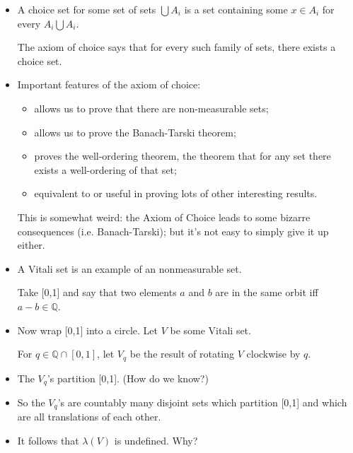 \documentclass[justified]{tufte-handout}
\begin{document}
\begin{itemize}

\item A choice set for some set of sets $\bigcup A_i$ is a set containing some $x \in A_i$ for every $A_i \bigcup A_i$.

The axiom of choice says that for every such family of sets, there exists a choice set.

\item Important features of the axiom of choice:

\begin{itemize}

\item allows us to prove that there are non-measurable sets;


\item allows us to prove the Banach-Tarski theorem;

\item proves the well-ordering theorem, the theorem that for any set there exists a well-ordering of that set;

\item equivalent to or useful in proving lots of other interesting results.


\end{itemize}

\noindent This is somewhat weird: the Axiom of Choice leads to some bizarre consequences (i.e. Banach-Tarski); but it's not easy to simply give it up either.


\item A Vitali set is an example of an nonmeasurable set. 

Take [0,1] and say that two elements $a$ and $b$ are in the same orbit iff $a-b \in \mathbb{Q}$.

\item Now wrap [0,1] into a circle. Let $V$ be some Vitali set. 

For $q\in\mathbb{Q}\cap[0,1]$, let $V_q$ be the result of rotating $V$ clockwise by $q$.

\item The $V_q$'s partition [0,1]. (How do we know?)

\item So the $V_q$'s are countably many disjoint sets which partition [0,1] and which are all translations of each other.

\item It follows that $\lambda(V)$ is undefined. Why?
\end{itemize} 
\end{document}
